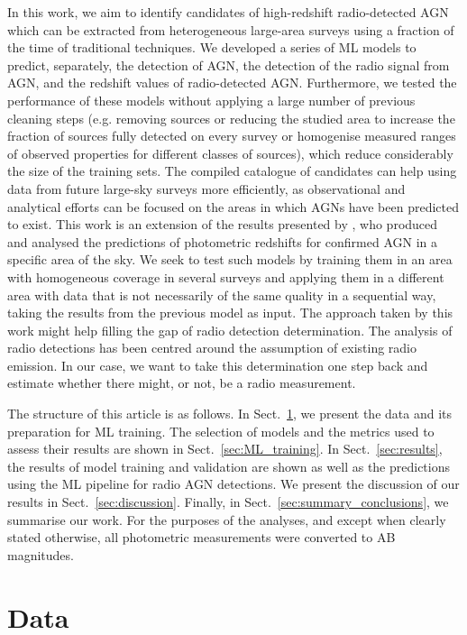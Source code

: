 \documentclass{aa}
\begin{document}
In this work, we aim to identify candidates of high-redshift radio-detected AGN which can be extracted from heterogeneous large-area surveys using a fraction of the time of traditional techniques. We developed a series of ML models to predict, separately, the detection of AGN, the detection of the radio signal from AGN, and the redshift values of radio-detected AGN. Furthermore, we tested the performance of these models without applying a large number of previous cleaning steps (e.g. removing sources or reducing the studied area to increase the fraction of sources fully detected on every survey or homogenise measured ranges of observed properties for different classes of sources), which reduce considerably the size of the training sets. The compiled catalogue of candidates can help using data from future large-sky surveys more efficiently, as observational and analytical efforts can be focused on the areas in which AGNs have been predicted to exist. This work is an extension of the results presented by \citet{2021Galax...9...86C}, who produced and analysed the predictions of photometric redshifts for confirmed AGN in a specific area of the sky. We seek to test such models by training them in an area with homogeneous coverage in several surveys and applying them in a different area with data that is not necessarily of the same quality in a sequential way, taking the results from the previous model as input. The approach taken by this work might help filling the gap of radio detection determination. The analysis of radio detections has been centred around the assumption of existing radio emission. In our case, we want to take this determination one step back and estimate whether there might, or not, be a radio measurement.

The structure of this article is as follows. In Sect.~\ref{sec:data}, we present the data and its preparation for ML training. The selection of models and the metrics used to assess their results are shown in Sect.~\ref{sec:ML_training}. In Sect.~\ref{sec:results}, the results of model training and validation are shown as well as the predictions using the ML pipeline for radio AGN detections. We present the discussion of our results in Sect.~\ref{sec:discussion}. Finally, in Sect.~\ref{sec:summary_conclusions}, we summarise our work. For the purposes of the analyses, and except when clearly stated otherwise, all photometric measurements were converted to AB magnitudes.

\section{Data}\label{sec:data}
\end{document}
